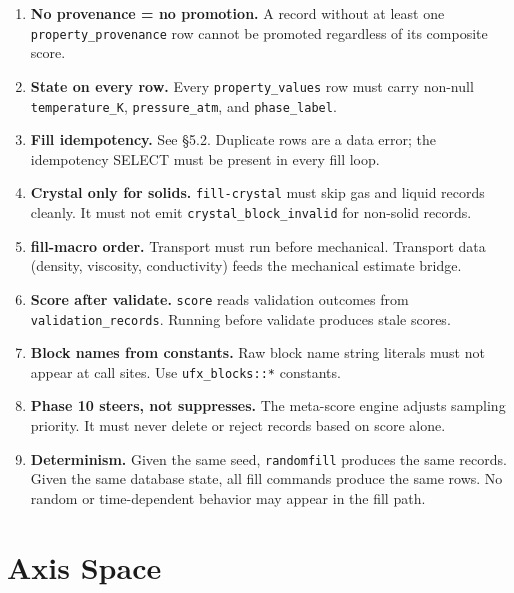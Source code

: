 \documentclass[11pt,letterpaper]{article}
\begin{document}
\begin{enumerate}[leftmargin=2em]
  \item \textbf{No provenance = no promotion.}  A record without at least
		one \texttt{property\_provenance} row cannot be promoted regardless
		of its composite score.

  \item \textbf{State on every row.}  Every \texttt{property\_values} row
		must carry non-null \texttt{temperature\_K}, \texttt{pressure\_atm},
		and \texttt{phase\_label}.

  \item \textbf{Fill idempotency.}  See \S5.2.  Duplicate rows are a
		data error; the idempotency SELECT must be present in every fill loop.

  \item \textbf{Crystal only for solids.}  \texttt{fill-crystal} must
		skip gas and liquid records cleanly.  It must not emit
		\texttt{crystal\_block\_invalid} for non-solid records.

  \item \textbf{fill-macro order.}  Transport must run before mechanical.
		Transport data (density, viscosity, conductivity) feeds the
		mechanical estimate bridge.

  \item \textbf{Score after validate.}  \texttt{score} reads validation
		outcomes from \texttt{validation\_records}.  Running before
		validate produces stale scores.

  \item \textbf{Block names from constants.}  Raw block name string literals
		must not appear at call sites.  Use \texttt{ufx\_blocks::*} constants.

  \item \textbf{Phase 10 steers, not suppresses.}  The meta-score engine
		adjusts sampling priority.  It must never delete or reject records
		based on score alone.

  \item \textbf{Determinism.}  Given the same seed, \texttt{randomfill}
		produces the same records.  Given the same database state, all
		fill commands produce the same rows.  No random or time-dependent
		behavior may appear in the fill path.
\end{enumerate}

\section{Axis Space}
\end{document}
